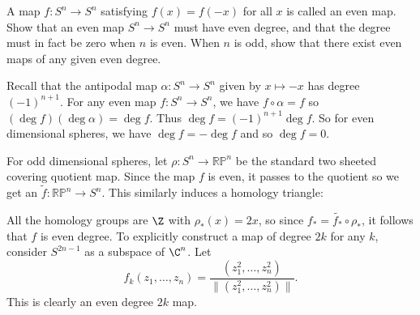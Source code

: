 \documentclass[11pt,letterpaper]{article}
\begin{document}
\begin{problem}
A map $f : S^n \to S^n$ satisfying $f(x) = f(-x)$ for all $x$ is called an even map. Show that an even map $S^n \to S^n$ must have even degree, and that the degree must in fact be zero when $n$ is even. When $n$ is odd, show that there exist even maps of any given even degree.
\end{problem}

\begin{solution}
    \quad Recall that the antipodal map $\alpha : S^n \to S^n$ given by $x\mapsto -x$ has degree $(-1)^{n+1}$. For any even map $f : S^n \to S^n$, we have $f\circ \alpha = f$ so $(\deg f)(\deg \alpha) = \deg f$. Thus $\deg f = (-1)^{n+1}\deg f$. So for even dimensional spheres, we have $\deg f = -\deg f$ and so $\deg f = 0$.

    \quad For odd dimensional spheres, let $\rho : S^n \to \mathbb{RP}^n$ be the standard two sheeted covering quotient map. Since the map $f$ is even, it passes to the quotient so we get an $\widetilde{f} : \mathbb{RP}^n \to S^n$. This similarly induces a homology triangle:
    \begin{center}
    \end{center}
    All the homology groups are $\Z$ with $\rho_*(x)=2x$, so since $f_* = \widetilde{f_*}\circ \rho_*$, it follows that $f$ is even degree. To explicitly construct a map of degree $2k$ for any $k$, consider $S^{2n-1}$ as a subspace of $\C^{n}$. Let 
    \[
        f_k(z_1,\ldots,z_n) = \frac{(z_1^2,\ldots,z_n^2)}{\|(z_1^2,\ldots,z_n^2)\|}
    .\]
    This is clearly an even degree $2k$ map.
    
\end{solution}
\end{document}
